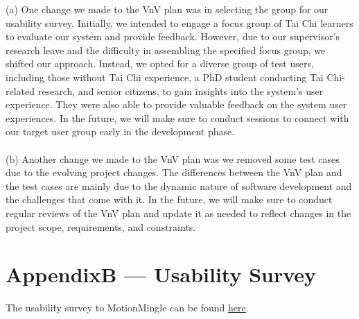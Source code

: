 \documentclass[12pt, titlepage]{article}
\begin{document}
(a) One change we made to the VnV plan was in selecting the group for our 
usability survey. Initially, we intended to engage a focus group of Tai Chi learners 
to evaluate our system and provide feedback. However, due to our supervisor's 
research leave and the difficulty in assembling the specified focus group, we 
shifted our approach. Instead, we opted for a diverse group of test users, 
including those without Tai Chi experience, a PhD student conducting Tai 
Chi-related research, and senior citizens, to gain insights into the system's 
user experience. They were also able to provide valuable feedback on the system 
user experiences. In the future, we will make sure to conduct sessions to connect 
with our target user group early in the development phase. \\\\
(b) Another change we made to the VnV plan was we removed some test cases due 
to the evolving project changes. The differences between the VnV plan and the 
test cases are mainly due to the dynamic nature of software development and the 
challenges that come with it. In the future, we will make sure to conduct regular 
reviews of the VnV plan and update it as needed to reflect changes in the project 
scope, requirements, and constraints.

\section*{AppendixB --- Usability Survey}
The usability survey to MotionMingle can be found \href{https://docs.google.com/forms/d/e/1FAIpQLSchSdc_kHr98yHP8QPyWItHoP-dj_hJnuEtNByH0V2M_iDjWw/viewform}{here}.
\end{document}
